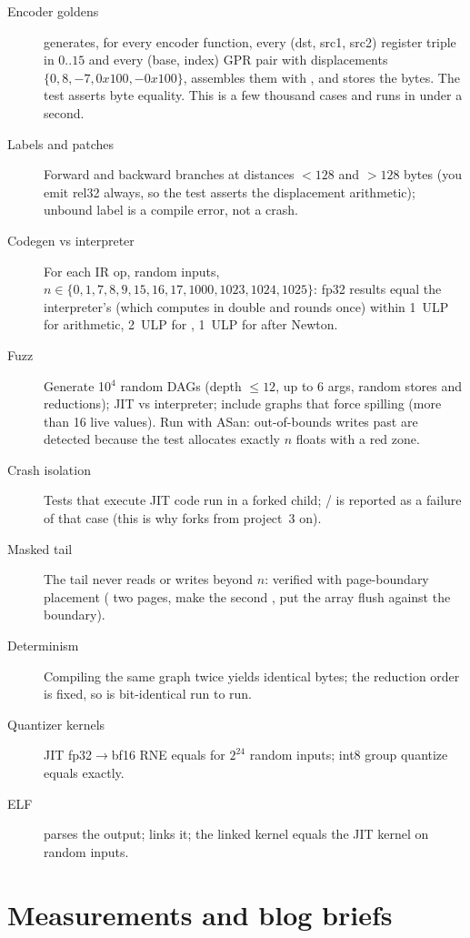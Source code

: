 \begin{description}
  \item[Encoder goldens]  generates, for every encoder function, every (dst, src1, src2) register triple in $0..15$ and every (base, index) GPR pair with displacements $\{0, 8, -7, 0x100, -0x100\}$, assembles them with , and stores the bytes. The test asserts byte equality. This is a few thousand cases and runs in under a second.
  \item[Labels and patches] Forward and backward branches at distances $< 128$ and $> 128$ bytes (you emit rel32 always, so the test asserts the displacement arithmetic); unbound label is a compile error, not a crash.
  \item[Codegen vs interpreter] For each IR op, random inputs, $n \in \{0, 1, 7, 8, 9, 15, 16, 17, 1000, 1023, 1024, 1025\}$: fp32 results equal the interpreter's (which computes in double and rounds once) within 1~ULP for arithmetic, 2~ULP for , 1~ULP for  after Newton.
  \item[Fuzz] Generate 10$^4$ random DAGs (depth $\le 12$, up to 6 args, random stores and reductions); JIT vs interpreter; include graphs that force spilling (more than 16 live values). Run with ASan: out-of-bounds writes past  are detected because the test allocates exactly $n$ floats with a red zone.
  \item[Crash isolation] Tests that execute JIT code run in a forked child; / is reported as a failure of that case (this is why  forks from project~3 on).
  \item[Masked tail] The tail never reads or writes beyond $n$: verified with page-boundary placement ( two pages, make the second , put the array flush against the boundary).
  \item[Determinism] Compiling the same graph twice yields identical bytes; the reduction order is fixed, so  is bit-identical run to run.
  \item[Quantizer kernels] JIT fp32$\to$bf16 RNE equals  for $2^{24}$ random inputs; int8 group quantize equals  exactly.
  \item[ELF]  parses the output;  links it; the linked kernel equals the JIT kernel on random inputs.
\end{description}

\section{Measurements and blog briefs}

